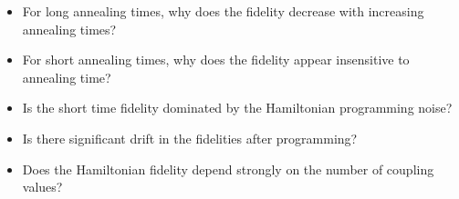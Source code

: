 \documentclass[12pt]{dalthesis}
\begin{document}
\begin{itemize}
	\item For long annealing times, why does the fidelity decrease with increasing annealing times?
	\item For short annealing times, why does the fidelity appear insensitive to annealing time?
	\item Is the short time fidelity dominated by the Hamiltonian programming noise?
	\item Is there significant drift in the fidelities after programming?
	\item Does the Hamiltonian fidelity depend strongly on the number of coupling values?
\end{itemize}



\end{document}
